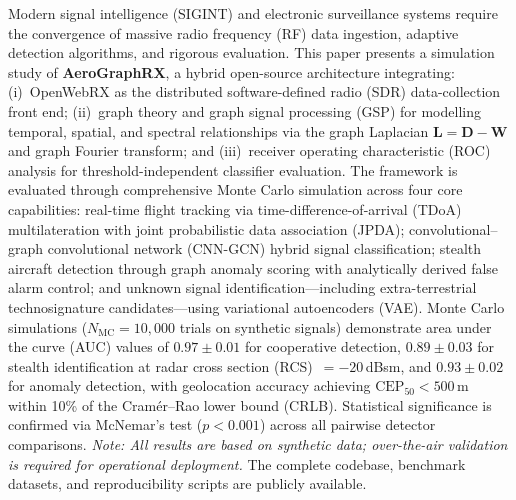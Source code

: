 \documentclass[sensors,article,submit,pdftex]{mdpi}
\newcommand{\mat}[1]{\mathbf{#1}}
\begin{document}


\address{\textsuperscript{1}Department of Pure and Applied Mathematics, Alliance School of Applied Mathematics, Alliance University, Bengaluru 562106, India}


\maketitle

\begin{MDPIabstract}
Modern signal intelligence (SIGINT) and electronic surveillance systems require the convergence of massive radio frequency (RF) data ingestion, adaptive detection algorithms, and rigorous evaluation. This paper presents a simulation study of \textbf{AeroGraphRX}, a hybrid open-source architecture integrating: (i)~OpenWebRX as the distributed software-defined radio (SDR) data-collection front end; (ii)~graph theory and graph signal processing (GSP) for modelling temporal, spatial, and spectral relationships via the graph Laplacian $\mat{L} = \mat{D} - \mat{W}$ and graph Fourier transform; and (iii)~receiver operating characteristic (ROC) analysis for threshold-independent classifier evaluation. The framework is evaluated through comprehensive Monte Carlo simulation across four core capabilities: real-time flight tracking via time-difference-of-arrival (TDoA) multilateration with joint probabilistic data association (JPDA); convolutional--graph convolutional network (CNN-GCN) hybrid signal classification; stealth aircraft detection through graph anomaly scoring with analytically derived false alarm control; and unknown signal identification---including extra-terrestrial technosignature candidates---using variational autoencoders (VAE). Monte Carlo simulations ($N_{\text{MC}} = 10{,}000$ trials on synthetic signals) demonstrate area under the curve (AUC) values of $0.97 \pm 0.01$ for cooperative detection, $0.89 \pm 0.03$ for stealth identification at radar cross section (RCS)~$= -20$\,dBsm, and $0.93 \pm 0.02$ for anomaly detection, with geolocation accuracy achieving $\text{CEP}_{50} < 500$\,m within 10\% of the Cram\'{e}r--Rao lower bound (CRLB). Statistical significance is confirmed via McNemar's test ($p < 0.001$) across all pairwise detector comparisons. \textit{Note: All results are based on synthetic data; over-the-air validation is required for operational deployment.} The complete codebase, benchmark datasets, and reproducibility scripts are publicly available.
\end{MDPIabstract}
\end{document}
